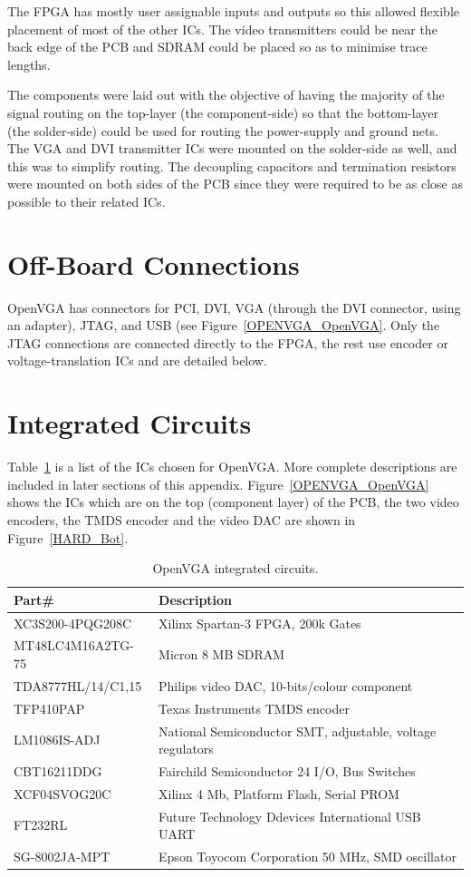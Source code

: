 The FPGA has mostly user assignable inputs and outputs so this allowed flexible
placement of most of the other ICs. The video transmitters could be near the back
edge of the PCB and SDRAM could be placed so as to minimise trace lengths.

The components were laid out with the objective of having the majority of the
signal routing on the top-layer (the component-side) so that the bottom-layer
(the solder-side) could be used for routing the power-supply and ground nets. The
VGA and DVI transmitter ICs were mounted on the solder-side as well, and this was
to simplify routing. The decoupling capacitors and termination resistors were
mounted on both sides of the PCB since they were required to be as close as
possible to their related ICs.


\section{Off-Board Connections}
OpenVGA has connectors for PCI, DVI, VGA (through the DVI connector, using an
adapter), JTAG, and USB (see Figure~\ref{OPENVGA_OpenVGA}. Only the JTAG
connections are connected directly to the FPGA, the rest use encoder or
voltage-translation ICs and are detailed below.


\section{Integrated Circuits}
Table~\ref{HARD_ICs} is a list of the ICs chosen for OpenVGA. More complete
descriptions are included in later sections of this appendix.
Figure~\ref{OPENVGA_OpenVGA} shows the ICs which are on the top (component layer)
of the PCB, the two video encoders, the TMDS encoder and the video DAC are shown
in Figure~\ref{HARD_Bot}.

\begin{table}[h!]
\begin{tabular}{l | l}
Part\#				& Description	\\
\hline
XC3S200-4PQG208C	&	Xilinx Spartan-3 FPGA, 200k Gates	\\
MT48LC4M16A2TG-75	&	Micron 8 MB SDRAM	\\
TDA8777HL/14/C1,15	&	Philips video DAC, 10-bits/colour component	\\
TFP410PAP			&	Texas Instruments TMDS encoder		\\
LM1086IS-ADJ		&	National Semiconductor SMT, adjustable, voltage regulators	\\
CBT16211DDG			&	Fairchild Semiconductor 24 I/O, Bus Switches	\\
XCF04SVOG20C		&	Xilinx 4 Mb, Platform Flash, Serial PROM	\\
FT232RL				&	Future Technology Ddevices International USB UART	\\
SG-8002JA-MPT		&	Epson Toyocom Corporation 50 MHz, SMD oscillator	\\
\end{tabular}
\caption[OpenVGA integrated circuits]{OpenVGA integrated circuits.}
\label{HARD_ICs}
\end{table}


